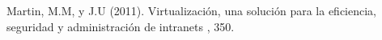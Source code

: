 \documentclass[twoside,twocolumn]{article}
\begin{document}
\begin{thebibliography}{99} %

Martin, M.M,  y J.U (2011).
\newblock Virtualización, una solución para la eficiencia,
seguridad y administración de intranets
, 350.
 
 
\end{thebibliography}

\end{document}
